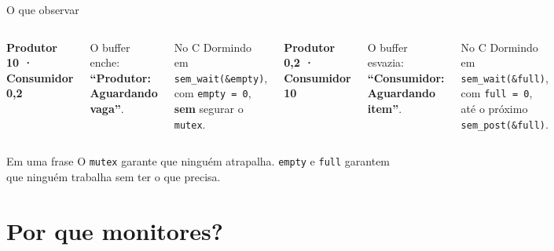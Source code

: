 \documentclass[aspectratio=169]{beamer}
\begin{document}
\begin{frame}{O que observar}
\begin{columns}[T]
\textbf{Produtor 10 · Consumidor 0,2}

\vspace{0.4em}
O buffer enche: \textbf{``Produtor: Aguardando vaga''}.

\vspace{0.4em}
\begin{alertblock}{No C}
Dormindo em \texttt{sem\_wait(\&empty)}, com \texttt{empty = 0}, \textbf{sem} segurar o \texttt{mutex}.
\end{alertblock}

\pause
\textbf{Produtor 0,2 · Consumidor 10}

\vspace{0.4em}
O buffer esvazia: \textbf{``Consumidor: Aguardando item''}.

\vspace{0.4em}
\begin{alertblock}{No C}
Dormindo em \texttt{sem\_wait(\&full)}, com \texttt{full = 0}, até o próximo \texttt{sem\_post(\&full)}.
\end{alertblock}
\end{columns}

\pause
\vspace{0.8em}
\begin{exampleblock}{Em uma frase}
O \texttt{mutex} garante que ninguém atrapalha. \texttt{empty} e \texttt{full} garantem que ninguém trabalha sem ter o que precisa.
\end{exampleblock}
\end{frame}

\section{Por que monitores?}
\end{document}
